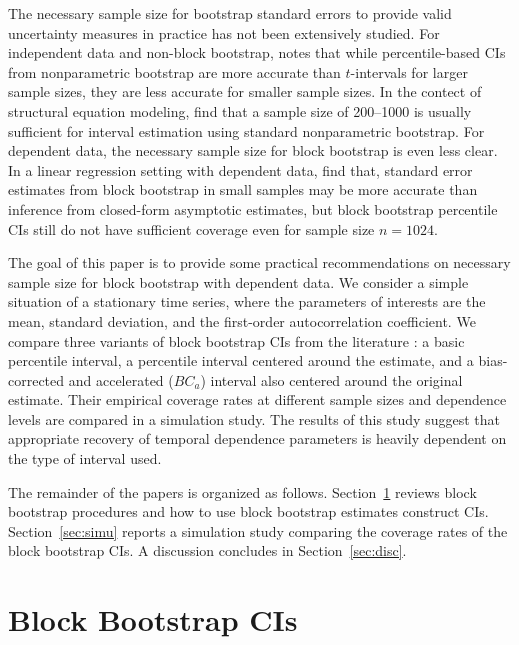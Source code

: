 \documentclass[12pt, letterpaper, titlepage]{article}
\begin{document}
The necessary sample size for bootstrap standard errors to provide valid
uncertainty measures in practice has not been extensively studied. For
independent data and non-block bootstrap, \citet{hesterberg2015teachers} notes
that while percentile-based CIs from nonparametric bootstrap
are more accurate than $t$-intervals for larger sample sizes, they are
less accurate for smaller sample sizes. In the contect of structural equation
modeling, \citet{nevitt2001performance} find
that a sample size of 200--1000 is usually sufficient for interval estimation
using standard nonparametric bootstrap. For dependent data, the necessary sample
size for block bootstrap is even less clear. In a linear regression setting with
dependent data, \citet{goncalves2005bootstrap} find that, standard error
estimates from block bootstrap in small samples may be more accurate than
inference from closed-form asymptotic estimates, but block bootstrap percentile
CIs still do not have sufficient coverage even for sample size
$n = 1024$.


The goal of this paper is to provide some practical recommendations on
necessary sample size for block bootstrap with dependent data. We consider a
simple situation of a stationary time series, where the parameters of
interests are the mean, standard deviation, and the first-order
autocorrelation coefficient. We compare three variants of block bootstrap
CIs from the literature \citep{diciccio1996bootstrap,
  rice2006mathematical}: a basic percentile interval, a percentile
interval centered around the estimate, and a bias-corrected and
accelerated ($BC_a$) interval also centered around the original estimate. Their
empirical coverage rates at different sample sizes and dependence levels are
compared in a simulation study. The results of this study suggest that
appropriate recovery of temporal dependence parameters is heavily dependent on
the type of interval used.


The remainder of the papers is organized as follows.
Section~\ref{sec:bbci} reviews block bootstrap procedures and how to use block
bootstrap estimates construct CIs. Section~\ref{sec:simu} reports a simulation
study comparing the coverage rates of the block bootstrap CIs. A discussion
concludes in Section~\ref{sec:disc}.


\section{Block Bootstrap CIs}
\label{sec:bbci}
\end{document}

